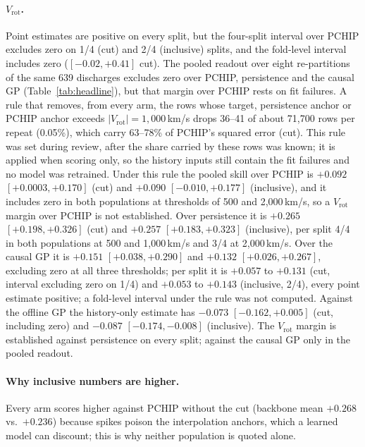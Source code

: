 \documentclass[10pt,twocolumn,letterpaper]{article}
\newcommand{\Vrot}{\ensuremath{V_\mathrm{rot}}}
\begin{document}
\paragraph{\Vrot{}.} Point estimates are positive on every split, but the four-split
interval over PCHIP excludes zero on 1/4 (cut) and 2/4 (inclusive) splits, and the
fold-level interval includes zero ($[-0.02, +0.41]$ cut). The pooled readout over
eight re-partitions of the same 639 discharges excludes zero over PCHIP, persistence
and the causal GP (Table~\ref{tab:headline}), but that margin over PCHIP rests on fit
failures. A rule that removes, from every arm, the rows whose target, persistence
anchor or PCHIP anchor exceeds $|\Vrot| = 1{,}000$\,km/s drops 36--41 of about 71{,}700
rows per repeat (0.05\%), which carry 63--78\% of PCHIP's squared error (cut). This
rule was set during review, after the share carried by these rows was known; it is
applied when scoring only, so the history inputs still contain the fit failures and no
model was retrained. Under this rule the pooled skill over PCHIP is $+0.092$
$[+0.0003, +0.170]$ (cut) and $+0.090$ $[-0.010, +0.177]$ (inclusive), and it includes
zero in both populations at thresholds of 500 and 2{,}000\,km/s, so a \Vrot{} margin
over PCHIP is not established. Over persistence it is $+0.265$ $[+0.198, +0.326]$ (cut)
and $+0.257$ $[+0.183, +0.323]$ (inclusive), per split 4/4 in both populations at 500
and 1{,}000\,km/s and 3/4 at 2{,}000\,km/s. Over the causal GP it is $+0.151$
$[+0.038, +0.290]$ and $+0.132$ $[+0.026, +0.267]$, excluding zero at all three
thresholds; per split it is $+0.057$ to $+0.131$ (cut, interval excluding zero on 1/4)
and $+0.053$ to $+0.143$ (inclusive, 2/4), every point estimate positive; a fold-level
interval under the rule was not computed. Against the offline GP the history-only
estimate has $-0.073$ $[-0.162, +0.005]$ (cut, including zero) and $-0.087$
$[-0.174, -0.008]$ (inclusive). The \Vrot{} margin is established against persistence
on every split; against the causal GP only in the pooled readout.

\paragraph{Why inclusive numbers are higher.} Every arm scores higher against PCHIP
without the cut (backbone mean $+0.268$ vs.\ $+0.236$) because spikes poison the
interpolation anchors, which a learned model can discount; this is why neither
population is quoted alone.
\end{document}
